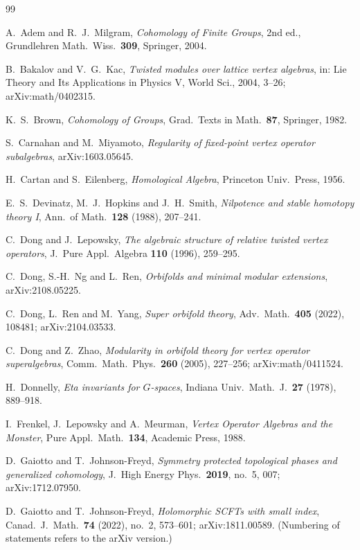 \documentclass[11pt]{amsart}
\theoremstyle{definition}
\begin{document}
\begin{thebibliography}{99}

A.~Adem and R.~J.~Milgram, \emph{Cohomology of Finite Groups}, 2nd ed., Grundlehren Math.\ Wiss.\
\textbf{309}, Springer, 2004.

B.~Bakalov and V.~G.~Kac, \emph{Twisted modules over lattice vertex algebras}, in: Lie Theory and Its
Applications in Physics V, World Sci., 2004, 3--26; arXiv:math/0402315.

K.~S.~Brown, \emph{Cohomology of Groups}, Grad.\ Texts in Math.\ \textbf{87}, Springer, 1982.

S.~Carnahan and M.~Miyamoto, \emph{Regularity of fixed-point vertex operator subalgebras},
arXiv:1603.05645.

H.~Cartan and S.~Eilenberg, \emph{Homological Algebra}, Princeton Univ.\ Press, 1956.

E.~S.~Devinatz, M.~J.~Hopkins and J.~H.~Smith, \emph{Nilpotence and stable homotopy theory I}, Ann.\ of
Math.\ \textbf{128} (1988), 207--241.

C.~Dong and J.~Lepowsky, \emph{The algebraic structure of relative twisted vertex operators}, J.\ Pure
Appl.\ Algebra \textbf{110} (1996), 259--295.

C.~Dong, S.-H.~Ng and L.~Ren, \emph{Orbifolds and minimal modular extensions}, arXiv:2108.05225.

C.~Dong, L.~Ren and M.~Yang, \emph{Super orbifold theory}, Adv.\ Math.\ \textbf{405} (2022), 108481;
arXiv:2104.03533.

C.~Dong and Z.~Zhao, \emph{Modularity in orbifold theory for vertex operator superalgebras}, Comm.\
Math.\ Phys.\ \textbf{260} (2005), 227--256; arXiv:math/0411524.

\bibitem{Donnelly}
H.~Donnelly, \emph{Eta invariants for $G$-spaces}, Indiana Univ.\ Math.\ J.\ \textbf{27} (1978),
889--918.

I.~Frenkel, J.~Lepowsky and A.~Meurman, \emph{Vertex Operator Algebras and the Monster}, Pure Appl.\
Math.\ \textbf{134}, Academic Press, 1988.

\bibitem{GJF17}
D.~Gaiotto and T.~Johnson-Freyd, \emph{Symmetry protected topological phases and generalized
cohomology}, J.\ High Energy Phys.\ \textbf{2019}, no.~5, 007; arXiv:1712.07950.

\bibitem{GJF}
D.~Gaiotto and T.~Johnson-Freyd, \emph{Holomorphic SCFTs with small index}, Canad.\ J.\ Math.\
\textbf{74} (2022), no.~2, 573--601; arXiv:1811.00589. (Numbering of statements refers to the arXiv
version.)


\end{thebibliography}
\end{document}
